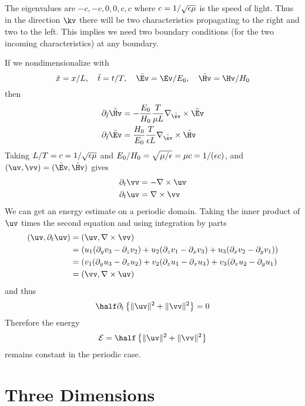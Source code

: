 \documentclass[10pt]{article}
\newcommand{\grad}{\nabla}
\begin{document}
The eigenvalues are $-c,-c,0,0,c,c$ where $c=1/\sqrt{\epsilon\mu}$ is the speed of light.
Thus in the direction $\kv$ there will be two characteristics propagating to the 
right and two to the left. This implies we need two boundary conditions (for the two
incoming characteristics) at any boundary.

If we nondimensionalize with
\[
   \tilde{x}=x/L, \quad \tilde{t}=t/T, \quad \tilde{\Ev}=\Ev/E_0, \quad \tilde{\Hv}=\Hv/H_0
\]
then
\begin{align*}
  \partial_{\tilde{t}} \tilde{\Hv} &= - {E_0\over H_0} {T\over \mu L} \grad_{\tilde{\xv}} \times \tilde{\Ev} \\
  \partial_{\tilde{t}} \tilde{\Ev} &=   {H_0\over E_0} {T\over \eps L} \grad_{\tilde{\xv}} \times \tilde{\Hv} 
\end{align*}
Taking $L/T=c=1/\sqrt{\epsilon \mu}$ and $E_0/H_0=\sqrt{\mu/\epsilon}=\mu c = 1/(\epsilon c)$, 
and $(\uv,\vv)=(\tilde{\Ev},\tilde{\Hv})$
gives
\begin{align*}
  \partial_t \vv &= - \grad\times\uv \\
  \partial_t \uv &=  \grad\times\vv
\end{align*}
We can get an energy estimate on a periodic domain. Taking the inner product of $\uv$ times the second
equation and using integration by parts
\begin{align*}
  (\uv,\partial_t \uv) &= (\uv,\grad\times\vv) \\
                       &= ( u_1(\partial_y v_3 - \partial_z v_2) + u_2(\partial_z v_1 - \partial_x v_3)
                            + u_3(\partial_x v_2 - \partial_y v_1) ) \\
                       &= ( v_1( \partial_y u_3 - \partial_z u_2 ) + v_2(\partial_z u_1- \partial_x u_3)
                          + v_3(\partial_x u_2- \partial_y u_1) \\
                       &= ( \vv, \grad\times\uv )
\end{align*}
and thus
\[
   \half \partial_t\left\{ \| \uv \|^2 + \| \vv \|^2 \right\} = 0
\]
Therefore the energy 
\[
{\cal E} = \half\left\{ \| \uv \|^2 + \| \vv\|^2 \right\}
\]
remains constant in the periodic case.

\clearpage
\section{Three Dimensions}
\end{document}
